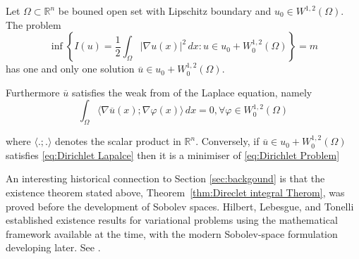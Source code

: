 \begin{theorem}
\label{thm:Direclet integral Therom}
Let $\Omega \subset \mathbb{R}^n$ be bouned open set with Lipschitz boundary and $u_0 \in W^{1,2}(\Omega)$. The problem
\begin{equation}
\label{eq:Dirichlet Problem}
\tag{D}
    \inf \left\{ I(u) = \frac{1}{2} \int_\Omega  |\nabla u(x)|^2 \, dx : u \in u_0+W_0^{1,2}(\Omega)\right\} = m
\end{equation}
has one and only one solution $\overline{u} \in u_0 + W_0^{1,2}(\Omega)$.

Furthermore $\overline{u}$ satisfies the weak from of the Laplace equation, namely
\begin{equation}
\label{eq:Dirichlet Lapalce}
    \int_\Omega \langle \nabla\overline{u}(x); \nabla \varphi(x) \rangle \, dx = 0, \forall \varphi \in W_0^{1,2}(\Omega)
\end{equation}

where $\langle .;. \rangle$ denotes the scalar product in $\mathbb{R}^n$. Conversely, if $\overline{u} \in u_0 +W_0^{1,2}(\Omega)$ satisfies \eqref{eq:Dirichlet Lapalce} then it is a minimiser of \eqref{eq:Dirichlet Problem}
\end{theorem}

\begin{remark}
An interesting historical connection to Section \ref{sec:backgound} is that the existence theorem stated above, Theorem~\ref{thm:Direclet integral Therom}, was proved before the development of Sobolev spaces. Hilbert, Lebesgue, and Tonelli established existence results for variational problems using the mathematical framework available at the time, with the modern Sobolev-space formulation developing later. See \cite{dacorogna}.
\end{remark}

